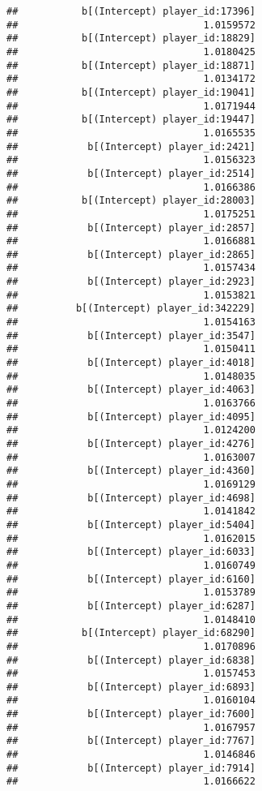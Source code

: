 \documentclass[
]{article}
\begin{document}
\begin{verbatim}
##           b[(Intercept) player_id:17396] 
##                                1.0159572 
##           b[(Intercept) player_id:18829] 
##                                1.0180425 
##           b[(Intercept) player_id:18871] 
##                                1.0134172 
##           b[(Intercept) player_id:19041] 
##                                1.0171944 
##           b[(Intercept) player_id:19447] 
##                                1.0165535 
##            b[(Intercept) player_id:2421] 
##                                1.0156323 
##            b[(Intercept) player_id:2514] 
##                                1.0166386 
##           b[(Intercept) player_id:28003] 
##                                1.0175251 
##            b[(Intercept) player_id:2857] 
##                                1.0166881 
##            b[(Intercept) player_id:2865] 
##                                1.0157434 
##            b[(Intercept) player_id:2923] 
##                                1.0153821 
##          b[(Intercept) player_id:342229] 
##                                1.0154163 
##            b[(Intercept) player_id:3547] 
##                                1.0150411 
##            b[(Intercept) player_id:4018] 
##                                1.0148035 
##            b[(Intercept) player_id:4063] 
##                                1.0163766 
##            b[(Intercept) player_id:4095] 
##                                1.0124200 
##            b[(Intercept) player_id:4276] 
##                                1.0163007 
##            b[(Intercept) player_id:4360] 
##                                1.0169129 
##            b[(Intercept) player_id:4698] 
##                                1.0141842 
##            b[(Intercept) player_id:5404] 
##                                1.0162015 
##            b[(Intercept) player_id:6033] 
##                                1.0160749 
##            b[(Intercept) player_id:6160] 
##                                1.0153789 
##            b[(Intercept) player_id:6287] 
##                                1.0148410 
##           b[(Intercept) player_id:68290] 
##                                1.0170896 
##            b[(Intercept) player_id:6838] 
##                                1.0157453 
##            b[(Intercept) player_id:6893] 
##                                1.0160104 
##            b[(Intercept) player_id:7600] 
##                                1.0167957 
##            b[(Intercept) player_id:7767] 
##                                1.0146846 
##            b[(Intercept) player_id:7914] 
##                                1.0166622 

\end{verbatim}
\end{document}
